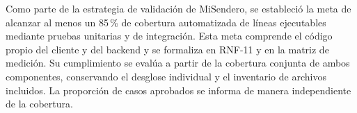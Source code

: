 Como parte de la estrategia de validación de MiSendero, se estableció la meta de alcanzar al menos un 85\,\% de cobertura automatizada de líneas ejecutables mediante pruebas unitarias y de integración. Esta meta comprende el código propio del cliente y del backend y se formaliza en RNF-11 y en la matriz de medición. Su cumplimiento se evalúa a partir de la cobertura conjunta de ambos componentes, conservando el desglose individual y el inventario de archivos incluidos. La proporción de casos aprobados se informa de manera independiente de la cobertura.
